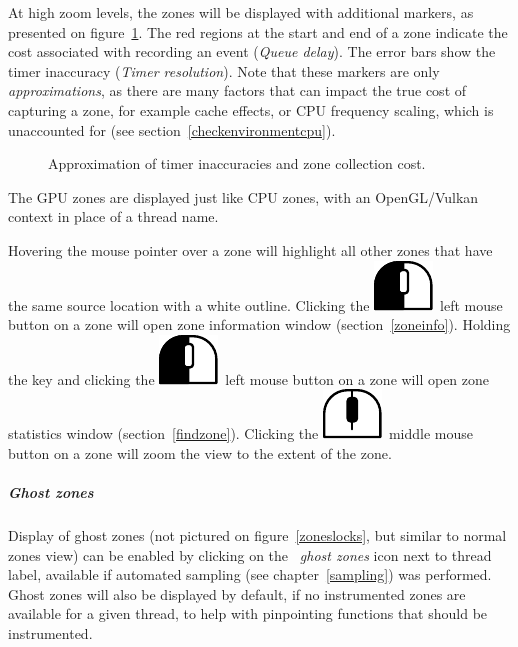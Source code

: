 \documentclass[hidelinks,titlepage,a4paper]{article}
\newcommand{\LMB}{\includegraphics[height=.8\baselineskip]{icons/lmb}}
\newcommand{\MMB}{\includegraphics[height=.8\baselineskip]{icons/mmb}}
\begin{document}
At high zoom levels, the zones will be displayed with additional markers, as presented on figure~\ref{inaccuracy}. The red regions at the start and end of a zone indicate the cost associated with recording an event (\emph{Queue delay}). The error bars show the timer inaccuracy (\emph{Timer resolution}). Note that these markers are only \emph{approximations}, as there are many factors that can impact the true cost of capturing a zone, for example cache effects, or CPU frequency scaling, which is unaccounted for (see section~\ref{checkenvironmentcpu}).

\begin{figure}[h]
\centering{}
\caption{Approximation of timer inaccuracies and zone collection cost.}
\label{inaccuracy}
\end{figure}

The GPU zones are displayed just like CPU zones, with an OpenGL/Vulkan context in place of a thread name.

Hovering the \faMousePointer{} mouse pointer over a zone will highlight all other zones that have the same source location with a white outline. Clicking the \LMB{}~left mouse button on a zone will open zone information window (section~\ref{zoneinfo}). Holding the \keys{\ctrl} key and clicking the \LMB{}~left mouse button on a zone will open zone statistics window (section~\ref{findzone}). Clicking the \MMB{}~middle mouse button on a zone will zoom the view to the extent of the zone.

\subparagraph{Ghost zones}

Display of ghost zones (not pictured on figure~\ref{zoneslocks}, but similar to normal zones view) can be enabled by clicking on the \emph{\faGhost{}~ghost zones} icon next to thread label, available if automated sampling (see chapter~\ref{sampling}) was performed. Ghost zones will also be displayed by default, if no instrumented zones are available for a given thread, to help with pinpointing functions that should be instrumented.
\end{document}

